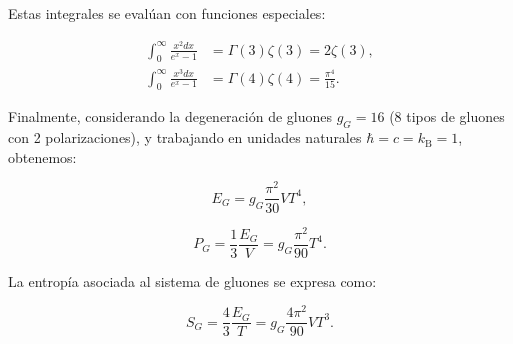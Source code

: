 Estas integrales se evalúan con funciones especiales:

\begin{align}
\int_0^\infty \frac{x^2 dx}{e^x - 1} &= \Gamma(3)\zeta(3) = 2\zeta(3), \label{eq-sol-int-N} \\
\int_0^\infty \frac{x^3 dx}{e^x - 1} &= \Gamma(4)\zeta(4) = \frac{\pi^4}{15}. \label{eq-sol-int-E}
\end{align}

Finalmente, considerando la degeneración de gluones \( g_G = 16 \) (8 tipos de gluones con 2 polarizaciones), y trabajando en unidades naturales \( \hbar = c = k_{\mathrm{B}} = 1 \), obtenemos:

\begin{equation}\label{eq-BE-Etotalgluons}
E_G = g_G \frac{\pi^2}{30} V T^4,
\end{equation}

\begin{equation}\label{eq-BE-Pgluons}
P_G = \frac{1}{3} \frac{E_G}{V} = g_G \frac{\pi^2}{90} T^4.
\end{equation}

La entropía asociada al sistema de gluones se expresa como:

\begin{equation}\label{eq-BE-Sgluons}
S_G = \frac{4}{3} \frac{E_G}{T} = g_G \frac{4\pi^2}{90} V T^3.
\end{equation}
